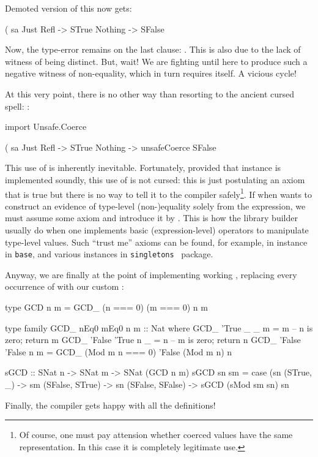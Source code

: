 \documentclass[demotion-paper.tex]{subfiles}
\begin{document}
Demoted version of this now gets:

\begin{code}
(%
sa %
  Just Refl -> STrue
  Nothing -> SFalse  
\end{code}

Now, the type-error remains on the last clause: .
This is also due to the lack of witness of being distinct.
But, wait! We are fighting until here to produce such a negative witness of non-equality, which in turn requires itself. A vicious cycle!

At this very point, there is no other way than resorting to the ancient cursed spell: :

\begin{code}
import Unsafe.Coerce

(%
sa %
  Just Refl -> STrue
  Nothing -> unsafeCoerce SFalse  
\end{code}

This use of  is inherently inevitable.
Fortunately, provided that  instance is implemented soundly, this use of  is not cursed: this is just postulating an axiom that is true but there is no way to tell it to the compiler safely\footnote{Of course, one must pay attension whether coerced values have the same representation. In this case it is completely legitimate use.}.
If when wants to construct an evidence of type-level (non-)equality solely from the expression, we must assume some axiom and introduce it by .
This is how the library builder usually do when one implements basic (expression-level) operators to manipulate type-level values.
Such ``trust me'' axioms can be found, for example, in  instance in \texttt{base}, and various  instances in \texttt{singletons}~\cite{singletons} package.

Anyway, we are finally at the point of implementing working , replacing every occurrence of \hask{(==)} with our custom \hask{(===)}:

\begin{code}
type GCD n m = GCD_ (n === 0) (m === 0) n m

type family GCD_ nEq0 mEq0 n m :: Nat where
  GCD_ 'True  _      _ m = m -- n is zero; return m
  GCD_ 'False 'True  n _ = n -- m is zero; return n
  GCD_ 'False 'False n m = GCD_ (Mod m n === 0) 'False (Mod m n) n

sGCD :: SNat n -> SNat m -> SNat (GCD n m)
sGCD sn sm = case (sn %
  (STrue, _) -> sm
  (SFalse, STrue) -> sn
  (SFalse, SFalse) -> sGCD (sMod sm sn) sn
\end{code}

Finally, the compiler gets happy with all the definitions!
\end{document}
